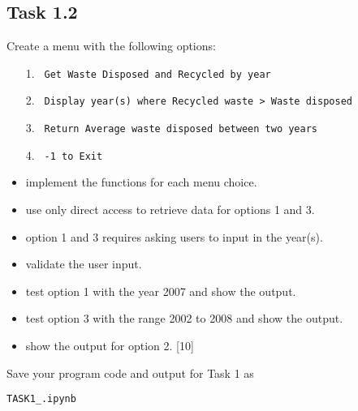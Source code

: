 \subsection*{Task 1.2}

Create a menu with the following options: 
\begin{enumerate}
\item[1.] \texttt{ Get Waste Disposed and Recycled by year }
\item[2.] \texttt{ Display year(s) where Recycled waste > Waste disposed }
\item[3.] \texttt{ Return Average waste disposed between two years }
\item[4.] \texttt{ -1 to Exit }
\end{enumerate}
\begin{itemize}
\item implement the functions for each menu choice. 
\item use only direct access to retrieve data for options 1 and 3. 
\item option 1 and 3 requires asking users to input in the year(s). 
\item validate the user input. 
\item test option 1 with the year 2007 and show the output. 
\item test option 3 with the range 2002 to 2008 and show the output. 
\item show the output for option 2. \hfill{}{[}10{]}
\end{itemize}
Save your program code and output for Task 1 as 

\texttt{TASK1\_<your name>.ipynb }